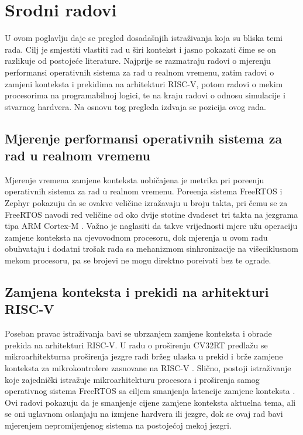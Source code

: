 \chapter{Srodni radovi}
\label{ch:srodni}

U ovom poglavlju daje se pregled dosada\v{s}njih istra\v{z}ivanja koja su bliska
temi rada. Cilj je smjestiti vlastiti rad u \v{s}iri kontekst i jasno pokazati
\v{c}ime se on razlikuje od postoje\'ce literature. Najprije se razmatraju radovi
o mjerenju performansi operativnih sistema za rad u realnom vremenu, zatim radovi
o zamjeni konteksta i prekidima na arhitekturi RISC-V, potom radovi o mekim
procesorima na programabilnoj logici, te na kraju radovi o odnosu simulacije i
stvarnog hardvera. Na osnovu tog pregleda izdvaja se pozicija ovog rada.

\section{Mjerenje performansi operativnih sistema za rad u realnom vremenu}
\label{sec:srodni-rtos}

Mjerenje vremena zamjene konteksta uobi\v{c}ajena je metrika pri pore\dj{}enju
operativnih sistema za rad u realnom vremenu. Pore\dj{}enja sistema FreeRTOS i
Zephyr pokazuju da se ovakve veli\v{c}ine izra\v{z}avaju u broju takta, pri \v{c}emu
se za FreeRTOS navodi red veli\v{c}ine od oko dvije stotine dvadeset tri takta na
jezgrama tipa ARM Cortex-M \citep{ulsolutions2022rtos}. Va\v{z}no je naglasiti da
takve vrijednosti mjere u\v{z}u operaciju zamjene konteksta na cjevovodnom
procesoru, dok mjerenja u ovom radu obuhvataju i dodatni tro\v{s}ak rada sa
mehanizmom sinhronizacije na vi\v{s}eciklusnom mekom procesoru, pa se brojevi ne
mogu direktno pore\dj{}ivati bez te ograde.

\section{Zamjena konteksta i prekidi na arhitekturi RISC-V}
\label{sec:srodni-riscv}

Poseban pravac istra\v{z}ivanja bavi se ubrzanjem zamjene konteksta i obrade
prekida na arhitekturi RISC-V. U radu o pro\v{s}irenju CV32RT predla\v{z}u se
mikroarhitekturna pro\v{s}irenja jezgre radi br\v{z}eg ulaska u prekid i br\v{z}e
zamjene konteksta za mikrokontrolere zasnovane na RISC-V \citep{balas2023cv32rt}.
Sli\v{c}no, postoji istra\v{z}ivanje koje zajedni\v{c}ki istra\v{z}uje
mikroarhitekturu procesora i pro\v{s}irenja samog operativnog sistema FreeRTOS sa
ciljem smanjenja latencije zamjene konteksta \citep{scheck2026coexploration}.
Ovi radovi pokazuju da je smanjenje cijene zamjene konteksta aktuelna tema, ali
se oni uglavnom oslanjaju na izmjene hardvera ili jezgre, dok se ovaj rad bavi
mjerenjem nepromijenjenog sistema na postoje\'coj mekoj jezgri.

